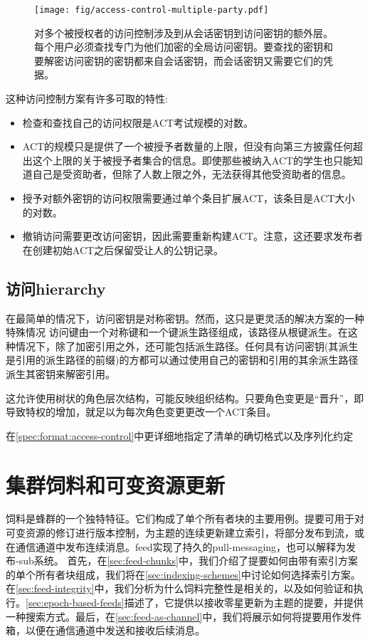 \begin{figure}[htbp]
\centering
\texttt{[image: fig/access-control-multiple-party.pdf]}
\caption[对多个被授权的访问控制\statusyellow]{对多个被授权者的访问控制涉及到从会话密钥到访问密钥的额外层。每个用户必须查找专门为他们加密的全局访问密钥。要查找的密钥和要解密访问密钥的密钥都来自会话密钥，而会话密钥又需要它们的凭据。} 
\label{fig:access-control-multiple-party}
\end{figure}


这种访问控制方案有许多可取的特性:
\begin{itemize}
\item 检查和查找自己的访问权限是ACT考试规模的对数。
\item ACT的规模只是提供了一个被授予者数量的上限，但没有向第三方披露任何超出这个上限的关于被授予者集合的信息。即使那些被纳入ACT的学生也只能知道自己是受资助者，但除了人数上限之外，无法获得其他受资助者的信息。
\item 授予对额外密钥的访问权限需要通过单个条目扩展ACT，该条目是ACT大小的对数。 
\item 撤销访问需要更改访问密钥，因此需要重新构建ACT。注意，这还要求发布者在创建初始ACT之后保留受让人的公钥记录。
\end{itemize}

\subsection{访问hierarchy\statusgreen}

在最简单的情况下，访问密钥是对称密钥。然而，这只是更灵活的解决方案的一种特殊情况
访问键由一个对称键和一个键派生路径组成，该路径从根键派生。在这种情况下，除了加密引用之外，还可能包括派生路径。任何具有访问密钥(其派生是引用的派生路径的前缀)的方都可以通过使用自己的密钥和引用的其余派生路径派生其密钥来解密引用。

这允许使用树状的角色层次结构，可能反映组织结构。只要角色变更是“晋升”，即导致特权的增加，就足以为每次角色变更更改一个ACT条目。

在\ref{spec:format:access-control}中更详细地指定了清单的确切格式以及序列化约定



\section{集群饲料和可变资源更新\statusyellow}\label{sec:feeds}

\green{}

饲料是蜂群的一个独特特征。它们构成了单个所有者块的主要用例。提要可用于对可变资源的修订进行版本控制，为主题的连续更新建立索引，将部分发布到流，或在通信通道中发布连续消息。feed实现了持久的pull-messaging，也可以解释为发布-sub系统。
首先，在\ref{sec:feed-chunks}中，我们介绍了提要如何由带有索引方案的单个所有者块组成，我们将在\ref{sec:indexing-schemes}中讨论如何选择索引方案。在\ref{sec:feed-integrity}中，我们分析为什么饲料完整性是相关的，以及如何验证和执行。\ref{sec:epoch-based-feeds}描述了，它提供以接收零星更新为主题的提要，并提供一种搜索方式。最后，在\ref{sec:feed-as-channel}中，我们将展示如何将提要用作发件箱，以便在通信通道中发送和接收后续消息。


